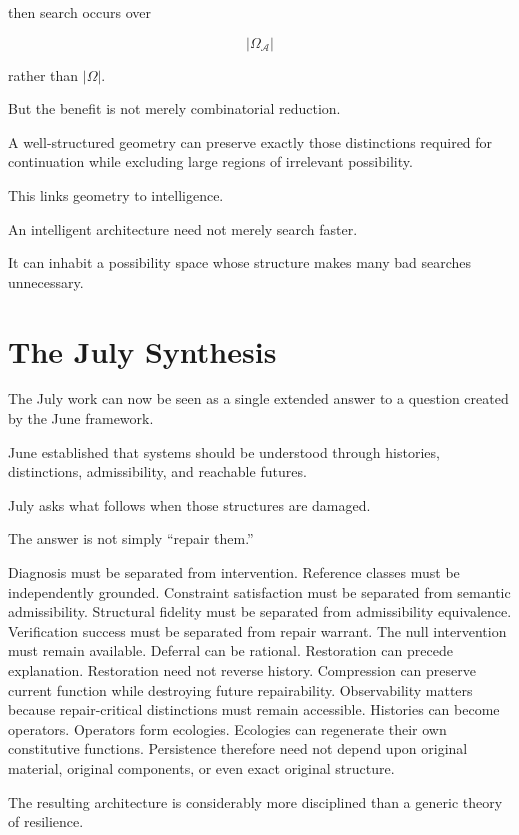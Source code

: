 \documentclass[11pt]{article}
\theoremstyle{remark}
\newcommand{\Adm}{\mathcal{A}}
\begin{document}
then search occurs over

\begin{equation}
|\Omega_{\Adm}|
\end{equation}

rather than $|\Omega|$.

But the benefit is not merely combinatorial reduction.

A well-structured geometry can preserve exactly those distinctions required for continuation while excluding large regions of irrelevant possibility.

This links geometry to intelligence.

An intelligent architecture need not merely search faster.

It can inhabit a possibility space whose structure makes many bad searches unnecessary.

\section{The July Synthesis}

The July work can now be seen as a single extended answer to a question created by the June framework.

June established that systems should be understood through histories, distinctions, admissibility, and reachable futures.

July asks what follows when those structures are damaged.

The answer is not simply ``repair them.''

Diagnosis must be separated from intervention. Reference classes must be independently grounded. Constraint satisfaction must be separated from semantic admissibility. Structural fidelity must be separated from admissibility equivalence. Verification success must be separated from repair warrant. The null intervention must remain available. Deferral can be rational. Restoration can precede explanation. Restoration need not reverse history. Compression can preserve current function while destroying future repairability. Observability matters because repair-critical distinctions must remain accessible. Histories can become operators. Operators form ecologies. Ecologies can regenerate their own constitutive functions. Persistence therefore need not depend upon original material, original components, or even exact original structure.

The resulting architecture is considerably more disciplined than a generic theory of resilience.
\end{document}
